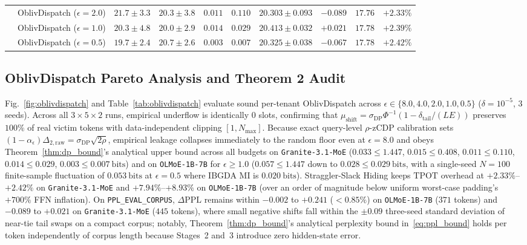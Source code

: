 \documentclass[10pt,journal,compsoc]{IEEEtran}
\def\OD{OblivDispatch}%
\theoremstyle{definition}
\theoremstyle{remark}
\newcommand{\OD}{\textsc{OblivDispatch}}
\begin{document}
\begin{table}[t]
{\begin{tabular}{llcccccccc}
      & \OD{} ($\epsilon = 2.0$) & $\mathbf{21.7 \pm 3.3}$ & $\mathbf{20.3 \pm 3.8}$ & $\mathbf{0.011}$ & $0.110$ & $20.303 \pm 0.093$ & $-0.089$ & $17.76$ & $+2.33\%$ \\
      & \OD{} ($\epsilon = 1.0$) & $\mathbf{20.3 \pm 4.8}$ & $\mathbf{20.0 \pm 2.9}$ & $\mathbf{0.014}$ & $0.029$ & $20.413 \pm 0.032$ & $+0.021$ & $17.78$ & $+2.39\%$ \\
      & \OD{} ($\epsilon = 0.5$) & $\mathbf{19.7 \pm 2.4}$ & $\mathbf{20.7 \pm 2.6}$ & $\mathbf{0.003}$ & $0.007$ & $20.325 \pm 0.038$ & $-0.067$ & $17.78$ & $+2.42\%$ \\
    \bottomrule
  \end{tabular}%
  }
\end{table}

\subsection{OblivDispatch Pareto Analysis and Theorem 2 Audit}
Fig.~\ref{fig:oblivdispatch} and Table~\ref{tab:oblivdispatch} evaluate sound per-tenant \OD{} across $\epsilon \in \{8.0, 4.0, 2.0, 1.0, 0.5\}$ ($\delta = 10^{-5}$, $3$ seeds). Across all $3 \times 5 \times 2$ runs, empirical underflow is identically $0$ slots, confirming that $\mu_{\mathrm{shift}} = \sigma_{\mathrm{DP}}\Phi^{-1}(1 - \delta_{\mathrm{tail}}/(LE))$ preserves $100\%$ of real victim tokens with data-independent clipping $[1, N_{\max}]$. Because exact query-level $\rho$-zCDP calibration sets $(1-\alpha_\epsilon)\Delta_{2,\mathrm{raw}} = \sigma_{\mathrm{DP}}\sqrt{2\rho}$, empirical leakage collapses immediately to the random floor even at $\epsilon = 8.0$ and obeys Theorem~\ref{thm:dp_bound}'s analytical upper bound across all budgets on \texttt{Granite-3.1-MoE} ($0.033 \le 1.447$, $0.015 \le 0.408$, $0.011 \le 0.110$, $0.014 \le 0.029$, $0.003 \le 0.007~\mathrm{bits}$) and on \texttt{OLMoE-1B-7B} for $\epsilon \ge 1.0$ ($0.057 \le 1.447$ down to $0.028 \le 0.029~\mathrm{bits}$, with a single-seed $N=100$ finite-sample fluctuation of $0.053~\mathrm{bits}$ at $\epsilon=0.5$ where IBGDA MI is $0.020~\mathrm{bits}$). Straggler-Slack Hiding keeps $\mathrm{TPOT}$ overhead at $+2.33\%$--$+2.42\%$ on \texttt{Granite-3.1-MoE} and $+7.94\%$--$+8.93\%$ on \texttt{OLMoE-1B-7B} (over an order of magnitude below uniform worst-case padding's $+700\%$ FFN inflation). On \texttt{PPL\_EVAL\_CORPUS}, $\Delta\mathrm{PPL}$ remains within $-0.002$ to $+0.241$ ($< 0.85\%$) on \texttt{OLMoE-1B-7B} ($371$ tokens) and $-0.089$ to $+0.021$ on \texttt{Granite-3.1-MoE} ($445$ tokens), where small negative shifts fall within the $\pm 0.09$ three-seed standard deviation of near-tie tail swaps on a compact corpus; notably, Theorem~\ref{thm:dp_bound}'s analytical perplexity bound in~\eqref{eq:ppl_bound} holds per token independently of corpus length because Stages~2 and~3 introduce zero hidden-state error.
\end{document}
